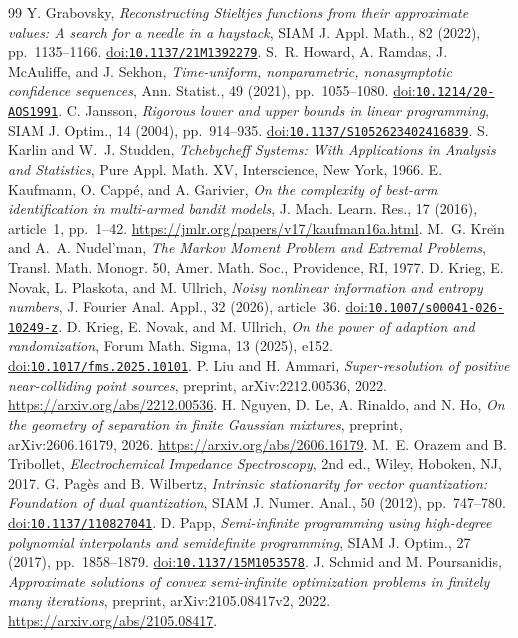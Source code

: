 \documentclass[10pt]{amsart}
\theoremstyle{definition}
\theoremstyle{remark}
\theoremstyle{plain}
\newcommand{\doi}[1]{\href{https://doi.org/#1}{doi:\nolinkurl{#1}}}
\begin{document}
\begin{thebibliography}{99}
 Y. Grabovsky, \emph{Reconstructing Stieltjes functions from their approximate values: A search for a needle in a haystack}, SIAM J. Appl. Math., 82 (2022), pp.~1135--1166. \doi{10.1137/21M1392279}.
 S.~R. Howard, A. Ramdas, J. McAuliffe, and J. Sekhon, \emph{Time-uniform, nonparametric, nonasymptotic confidence sequences}, Ann. Statist., 49 (2021), pp.~1055--1080. \doi{10.1214/20-AOS1991}.
 C. Jansson, \emph{Rigorous lower and upper bounds in linear programming}, SIAM J. Optim., 14 (2004), pp.~914--935. \doi{10.1137/S1052623402416839}.
 S. Karlin and W.~J. Studden, \emph{Tchebycheff Systems: With Applications in Analysis and Statistics}, Pure Appl. Math. XV, Interscience, New York, 1966.
 E. Kaufmann, O. Capp\'e, and A. Garivier, \emph{On the complexity of best-arm identification in multi-armed bandit models}, J. Mach. Learn. Res., 17 (2016), article~1, pp.~1--42. \url{https://jmlr.org/papers/v17/kaufman16a.html}.
 M.~G. Kre\u{\i}n and A.~A. Nudel'man, \emph{The Markov Moment Problem and Extremal Problems}, Transl. Math. Monogr. 50, Amer. Math. Soc., Providence, RI, 1977.
 D. Krieg, E. Novak, L. Plaskota, and M. Ullrich, \emph{Noisy nonlinear information and entropy numbers}, J. Fourier Anal. Appl., 32 (2026), article~36. \doi{10.1007/s00041-026-10249-z}.
 D. Krieg, E. Novak, and M. Ullrich, \emph{On the power of adaption and randomization}, Forum Math. Sigma, 13 (2025), e152. \doi{10.1017/fms.2025.10101}.
 P. Liu and H. Ammari, \emph{Super-resolution of positive near-colliding point sources}, preprint, arXiv:2212.00536, 2022. \url{https://arxiv.org/abs/2212.00536}.
 H. Nguyen, D. Le, A. Rinaldo, and N. Ho, \emph{On the geometry of separation in finite Gaussian mixtures}, preprint, arXiv:2606.16179, 2026. \url{https://arxiv.org/abs/2606.16179}.
 M.~E. Orazem and B. Tribollet, \emph{Electrochemical Impedance Spectroscopy}, 2nd ed., Wiley, Hoboken, NJ, 2017.
 G. Pag\`es and B. Wilbertz, \emph{Intrinsic stationarity for vector quantization: Foundation of dual quantization}, SIAM J. Numer. Anal., 50 (2012), pp.~747--780. \doi{10.1137/110827041}.
 D. Papp, \emph{Semi-infinite programming using high-degree polynomial interpolants and semidefinite programming}, SIAM J. Optim., 27 (2017), pp.~1858--1879. \doi{10.1137/15M1053578}.
 J. Schmid and M. Poursanidis, \emph{Approximate solutions of convex semi-infinite optimization problems in finitely many iterations}, preprint, arXiv:2105.08417v2, 2022. \url{https://arxiv.org/abs/2105.08417}.

\end{thebibliography}
\end{document}
